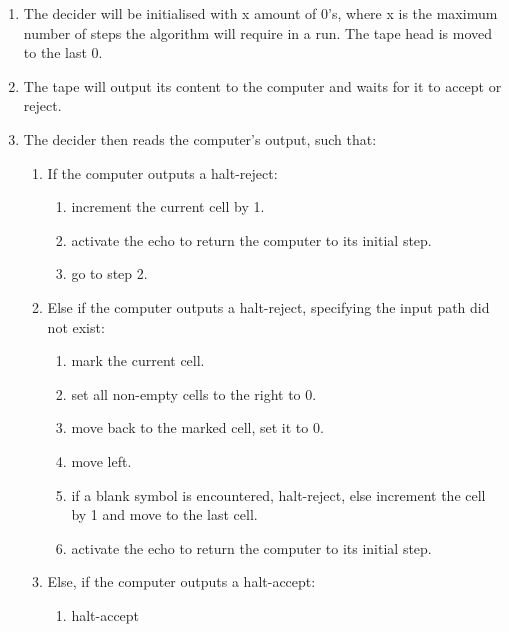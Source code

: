 \documentclass{report}
\begin{document}
\begin{enumerate}
  \item The decider will be initialised with x amount of 0's, where x is the maximum number of steps the algorithm will require in a run. The tape head is moved to the last 0.
  \item The tape will output its content to the computer and waits for it to accept or reject.
  \item The decider then reads the computer's output, such that:
  
  \begin{enumerate}
    \item If the computer outputs a halt-reject:
    
    \begin{enumerate}
      \item increment the current cell by 1.
      \item activate the echo to return the computer to its initial step.
      \item go to step 2.
    \end{enumerate}

    \item Else if the computer outputs a halt-reject, specifying the input path did not exist:
    
    \begin{enumerate}
      \item mark the current cell.
      \item set all non-empty cells to the right to 0.
      \item move back to the marked cell, set it to 0.
      \item move left.
      \item if a blank symbol is encountered, halt-reject, else increment the cell by 1 and move to the last cell.
      \item activate the echo to return the computer to its initial step.
    \end{enumerate}

    \item Else, if the computer outputs a halt-accept:
    
    \begin{enumerate}
      \item halt-accept
    \end{enumerate}

  \end{enumerate}

\end{enumerate}
\end{document}
